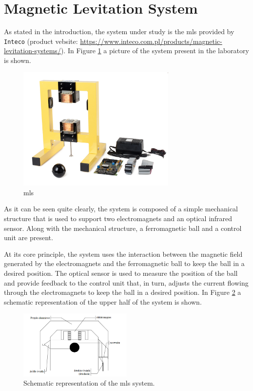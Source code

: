 \section{Magnetic Levitation System}
\label{sec:magnetic_levitation_system}

As stated in the introduction, the system under study is the \acrfull{mls} provided by \texttt{Inteco} (product vebsite: \url{https://www.inteco.com.pl/products/magnetic-levitation-systems/}).
In Figure \ref{fig:MLS} a picture of the system present in the laboratory is shown.

\begin{figure}[H]
    \centering
    \includegraphics[width=0.7\textwidth]{./img/maglev_picture.jpg}
    \caption{\acrlong{mls}}
    \label{fig:MLS}
\end{figure}

As it can be seen quite clearly, the system is composed of a simple mechanical structure that is used to support two electromagnets and an optical infrared sensor.
Along with the mechanical structure, a ferromagnetic ball and a control unit are present.

At its core principle, the system uses the interaction between the magnetic field generated by the electromagnets and the ferromagnetic ball to keep the ball in a desired position.
The optical sensor is used to measure the position of the ball and provide feedback to the control unit that, in turn, adjusts the current flowing through the electromagnets to keep the ball in a desired position.
In Figure \ref{fig:MLS_schematic} a schematic representation of the upper half of the system is shown.

\begin{figure}[H]
    \centering
    \includegraphics[width=0.5\textwidth]{./img/maglev_scheme.png}
    \caption{Schematic representation of the \acrshort{mls} system.}
    \label{fig:MLS_schematic}
\end{figure}


